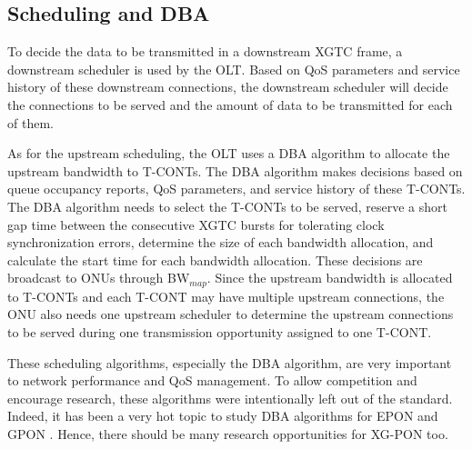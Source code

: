 

\subsection{Scheduling and DBA} \label{subsection_schedule_dba}

To decide the data to be transmitted in a downstream XGTC frame, a
downstream scheduler is used by the OLT. Based on QoS parameters
and service history of these downstream connections, the
downstream scheduler will decide the connections to be served and
the amount of data to be transmitted for each of them.

As for the upstream scheduling, the OLT uses a DBA algorithm to
allocate the upstream bandwidth to T-CONTs.  The DBA algorithm
makes decisions based on queue occupancy reports, QoS parameters,
and service history of these T-CONTs. The DBA algorithm needs to
select the T-CONTs to be served, reserve a short gap time between
the consecutive XGTC bursts for tolerating clock synchronization
errors, determine the size of each bandwidth allocation, and
calculate the start time for each bandwidth allocation. These
decisions are broadcast to ONUs through BW$_{map}$. Since the
upstream bandwidth is allocated to T-CONTs and each T-CONT may
have multiple upstream connections, the ONU also needs one
upstream scheduler to determine the upstream connections to be
served during one transmission opportunity assigned to one T-CONT.

These scheduling algorithms, especially the DBA algorithm, are
very important to network performance and QoS management. To allow
competition and encourage research, these algorithms were
intentionally left out of the standard. Indeed, it has been a very
hot topic to study DBA algorithms for EPON and GPON
\cite{han08dba4gpon}\cite{leligou06GiantMACforGPON}\cite{song09multithread4LRPON}.
Hence, there should be many research opportunities for XG-PON too.
